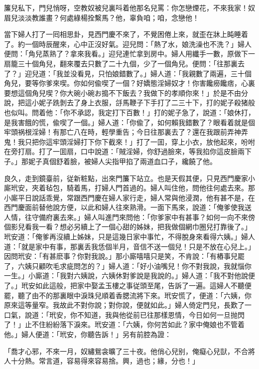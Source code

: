 簾兒私下，門兒悄呀，空教奴被兒裏呌着他那名兒罵：你怎戀煙花，不來我家！奴眉兒淡淡教誰畫？何處綠楊拴繫馬？他，辜負咱；咱，念戀他！

當下婦人打了一囘相思卦，見西門慶不來了，不覺困倦上來，就歪在牀上盹睡着了。約一個時辰醒來，心中正沒好氣。迎兒問：「熱了水，娘洗澡也不洗？」婦人便問：「角兒蒸熟了？拿來我看。」迎兒連忙拿到房中。婦人用纖手一數，原做下一扇籠三十個角兒，翻來覆去只數了二十九個，少了一個角兒。便問：「往那裏去了？」迎兒道：「我並没看見，只怕娘錯數了。」婦人道：「我親數了兩遍，三十個角兒，要等你爹來喫。你如何偸喫了一個？好嬌態淫婦奴才！你害饞癆饞痞，心裏要想這個角兒喫？你大碗小碗お搗不下飯去？我做下的孝順你來！」於是不由分說，把這小妮子跣剝去了身上衣服，㧱馬鞭子下手打了二三十下，打的妮子殺猪般也似叫。問着他：「你不承認，我定打下百數！」打的妮子急了，說道：「娘休打，是我害餓的慌，偸喫了一個。」婦人道：「你偸了，如何賴我錯數了？眼看着就是個牢頭祸根淫婦！有那亡八在時，輕學重告；今日往那裏去了？還在我跟前弄神弄鬼！我只把你這牢頭淫婦打下你下截來！」打了一囬，穿上小衣，放他起來，吩咐在旁打扇。打了一囬扇，口中說道：「賊淫婦，你舒過臉來，等我掐你這皮臉兩下子。」那妮子真個舒着臉，被婦人尖指甲掐了兩道血口子，纔饒了他。

良久，走到鏡臺前，従新粧點，出來門簾下站立。也是天假其便，只見西門慶家小廝玳安，夾着毡包，騎着馬，打婦人門首過的。婦人叫住他，問他往何處去來。那小廝平日說話乖覺，常跟西門慶在婦人家行走，婦人常與他浸潤，他有甚不是，在西門慶面前替他說方便，以此和婦人往來熟滑。一面下馬來，說道：「俺爹使我送人情，往守備府裏去來。」婦人叫進門來問他：「你爹家中有甚事？如何一向不來傍個影兒看我一看？想必另續上了一個心甜的姊妹，把我做個網巾圈兒打靠後了。」玳安道：「俺爹再沒續上姊妹，只是這幾日家中事忙，不得脫身來看得六姨。」婦人道：「就是家中有事，那裏丢我恁個半月，音信不送一個兒！只是不放在心兒上。」因問玳安：「有甚麽事？你對我說。」那小廝嘻嘻只是笑，不肯說：「有樁事兒罷了，六姨只顧吹毛求疵問怎的？」婦人道：「好小油嘴兒！你不對我說，我就惱你一生。」小廝道：「我對六姨說，六姨休對爹說是我說的。」婦人道：「我不對他說便了。」玳安如此這般，把家中娶孟玉樓之事従頭至尾，告訴了一遍。這婦人不聽便罷，聽了由不的那裏眼中淚珠兒順着香腮流將下來。玳安慌了，便道：「六姨，你原來這等量窄。我故此不對你說；對你說，便就如此。」婦人倚定門兒，長歎了一口氣，說道：「玳安，你不知道，我與他從前已往那樣恩情，今日如何一旦抛閃了！」止不住紛紛落下淚來。玳安道：「六姨，你何苦如此？家中俺娘也不管着他。」婦人便道：「玳安，你聽告訴！」另有前腔為證：

「喬才心邪，不來一月，奴繡鴛衾曠了三十夜。他俏心兒别，俺癡心兒獃，不合將人十分熱。常言道，容易得來容易捨。興，過也；緣，分也！」

